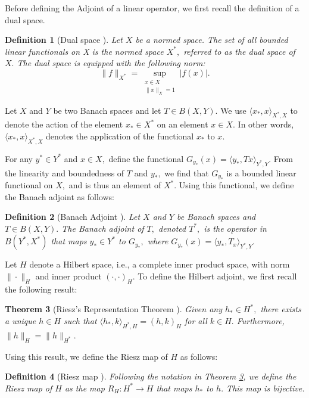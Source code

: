 \documentclass[12pt,a4paper]{article}
\theoremstyle{boldthm}
\newtheorem{theorem}{Theorem}[section]
\theoremstyle{bolddefn}
\newtheorem{definition}[theorem]{Definition}
\begin{document}
Before defining the Adjoint of a linear operator, we first recall the definition of a dual space.
\begin{definition}[{Dual space \cite[2.10-3]{krey}}] 
    Let $X$ be a normed space. The set of all bounded linear functionals on X is the normed space $X^*,$ referred to as the dual space of $X.$ The dual space is equipped with the following norm:
    \begin{equation}
        \| f \|_{X^*} = \sup_{\substack{x \in X \\ \|x\|_X =1}} | f(x) |. 
    \end{equation}
\end{definition} 


Let $ X$ and $Y$ be two Banach spaces and let $T \in B(X, Y).$ We use $\langle x_*, x \rangle_{X^*, X}$ to denote the action of the element $x_* \in X^*$ on an element $x \in X.$ In other words, $\langle x_*, x \rangle_{X^*, X}$ denotes the application of the functional $x_*$ to $x.$ 

 For any $y^* \in Y^*$ and $x \in X,$ define the functional $G_{y_*}(x) = \langle y_*, Tx \rangle_{Y^*, Y}.$ From the linearity and boundedness of $T$ and $y_*,$ we find that $G_{y_*}$ is a bounded linear functional on $X,$ and is thus an element of $X^*$.
Using this functional, we define the Banach adjoint as follows:
\begin{definition}[Banach Adjoint \cite{umberto}] \label{BA}
    Let $X$ and $Y$ be Banach spaces and $T \in B(X, Y).$ The Banach adjoint of $T,$ denoted $T^*,$ is the operator in $B(Y^*, X^*)$ that maps $y_* \in Y^*$ to $G_{y_*},$ where $G_{y_*}(x) = \langle y_*, T_x \rangle_{Y^*, Y}.$
\end{definition}

Let $H$ denote a Hilbert space, i.e., a complete inner product space, with norm $\|\cdot\|_H$ and inner product $(\cdot, \cdot)_H.$ To define the Hilbert adjoint, we first recall the following result:
\begin{theorem}[{Riesz's Representation Theorem \cite[3.8-1]{krey}}]  \label{RR}
    Given any $h_* \in H^*,$ there exists a unique $h \in H$ such that $\langle h_*, k \rangle_{H^*, H} = (h, k)_H$ for all $k \in H.$ Furthermore, $\| h \|_H = \| h \|_{H^*}.$
\end{theorem}
Using this result, we define the Riesz map of $H$ as follows:
\begin{definition}[Riesz map \cite{umberto}]
    Following the notation in Theorem \ref{RR}, we define the Riesz map of $H$ as the map $R_H : H^* \rightarrow H$ that maps $h_*$ to $h.$ This map is bijective. 
\end{definition}
\end{document}
